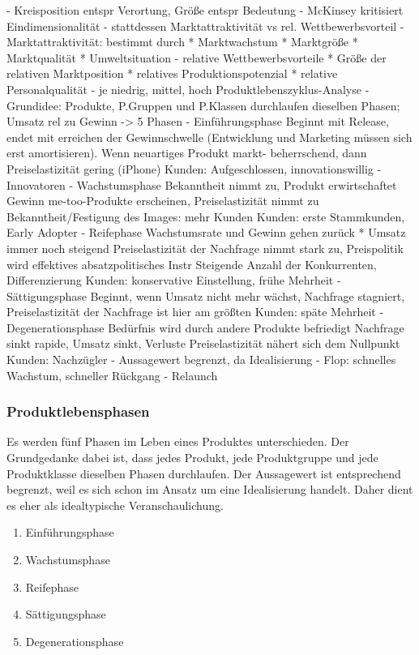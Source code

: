		- Kreisposition entspr Verortung, Größe entspr Bedeutung
	- McKinsey kritisiert Eindimensionalität
		- stattdessen Marktattraktivität vs rel. Wettbewerbsvorteil
			- Marktattraktivität: bestimmt durch
			 * Marktwachstum
			 * Marktgröße
			 * Marktqualität
			 * Umweltsituation
			- relative Wettbewerbsvorteile
			 * Größe der relativen Marktposition
			 * relatives Produktionspotenzial
			 * relative Personalqualität
		- je niedrig, mittel, hoch
Produktlebenszyklus-Analyse
	- Grundidee: Produkte, P.Gruppen und P.Klassen durchlaufen dieselben
	 Phasen; Umsatz rel zu Gewinn -> 5 Phasen
		- Einführungsphase
			 Beginnt mit Release, endet mit erreichen der
			 Gewinnschwelle (Entwicklung und Marketing müssen sich
			 erst amortisieren). Wenn neuartiges Produkt markt-
			 beherrschend, dann Preiselastizität gering (iPhone)
				Kunden: Aufgeschlossen, innovationswillig
				- Innovatoren
		- Wachstumsphase
			 Bekanntheit nimmt zu, Produkt erwirtschaftet Gewinn
			 me-too-Produkte erscheinen, Preiselastizität nimmt zu
			 Bekanntheit/Festigung des Images: mehr Kunden
				Kunden: erste Stammkunden, Early Adopter
		- Reifephase
			 Wachstumsrate und Gewinn gehen zurück
			 * Umsatz immer noch steigend
			 Preiselastizität der Nachfrage nimmt stark zu,
			 Preispolitik wird effektives absatzpolitisches Instr
			 Steigende Anzahl der Konkurrenten, Differenzierung
				Kunden: konservative Einstellung,
					frühe Mehrheit
		- Sättigungsphase
			 Beginnt, wenn Umsatz nicht mehr wächst, Nachfrage
			 stagniert, Preiselastizität der Nachfrage ist hier am
			 größten
				Kunden: späte Mehrheit
		- Degenerationsphase
			 Bedürfnis wird durch andere Produkte befriedigt
			 Nachfrage sinkt rapide, Umsatz sinkt, Verluste
			 Preiselastizität nähert sich dem Nullpunkt
				Kunden: Nachzügler 
	- Aussagewert begrenzt, da Idealisierung
		- Flop: schnelles Wachstum, schneller Rückgang
		- Relaunch

\subsubsection{Produktlebensphasen}

Es werden fünf Phasen im Leben eines Produktes unterschieden. Der Grundgedanke dabei ist, dass jedes Produkt, jede Produktgruppe und jede Produktklasse dieselben Phasen durchlaufen. Der Aussagewert ist entsprechend begrenzt, weil es sich schon im Ansatz um eine Idealisierung handelt. Daher dient es eher als idealtypische Veranschaulichung.

\begin{enumerate}
	\item Einführungsphase
	\item Wachstumsphase
	\item Reifephase
	\item Sättigungsphase
	\item Degenerationsphase
\end{enumerate}

